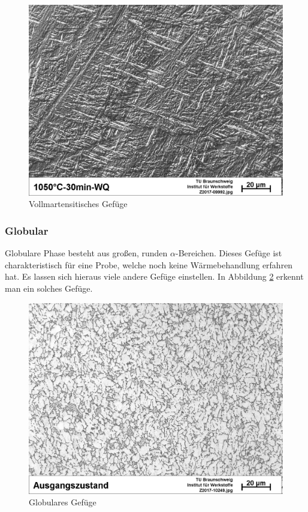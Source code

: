 \documentclass[a4paper, 11pt]{tubsreprt}
\begin{document}
\begin{figure}
\centering
\includegraphics[scale=0.5]{Bilder/Vollmartensit.jpg}
\caption{Vollmartensitisches Gefüge}
\label{vollmartensit}
\end{figure}
\subsubsection{Globular}
Globulare Phase besteht aus großen, runden $\alpha$-Bereichen. Dieses Gefüge ist charakteristisch für eine Probe, welche noch keine Wärmebehandlung erfahren hat. Es lassen sich hieraus viele andere Gefüge einstellen. In Abbildung \ref{globular} erkennt man ein solches Gefüge. 
\begin{figure}
\centering
\includegraphics[scale=0.6]{Bilder/Ausgangsgefuege.jpg}
\caption{Globulares Gefüge}
\label{globular}
\end{figure}
\end{document}

